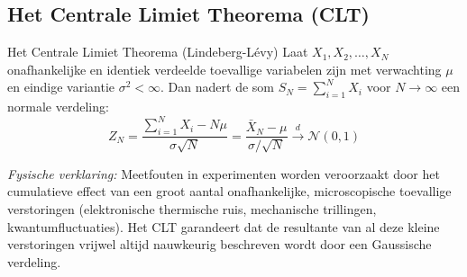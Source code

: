 \documentclass[11pt,a4paper]{article}
\newcommand{\normdist}{\mathcal{N}}
\begin{document}
\subsection{Het Centrale Limiet Theorema (CLT)}
\begin{theobox}{Het Centrale Limiet Theorema (Lindeberg-Lévy)}
Laat $X_1, X_2, \ldots, X_N$ onafhankelijke en identiek verdeelde toevallige variabelen zijn met verwachting $\mu$ en eindige variantie $\sigma^2 < \infty$. Dan nadert de som $S_N = \sum_{i=1}^N X_i$ voor $N \to \infty$ een normale verdeling:
\begin{equation}
    Z_N = \frac{\sum_{i=1}^N X_i - N\mu}{\sigma \sqrt{N}} = \frac{\bar{X}_N - \mu}{\sigma / \sqrt{N}} \xrightarrow{d} \normdist(0, 1)
\end{equation}
\end{theobox}

\emph{Fysische verklaring:} Meetfouten in experimenten worden veroorzaakt door het cumulatieve effect van een groot aantal onafhankelijke, microscopische toevallige verstoringen (elektronische thermische ruis, mechanische trillingen, kwantumfluctuaties). Het CLT garandeert dat de resultante van al deze kleine verstoringen vrijwel altijd nauwkeurig beschreven wordt door een Gaussische verdeling.
\end{document}
